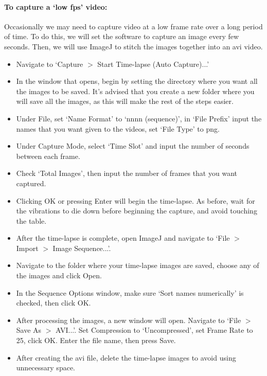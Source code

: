 \paragraph*{To capture a `low fps' video:}
Occasionally we may need to capture video at a low frame rate over a long period of time.
To do this, we will set the software to capture an image every few seconds.
Then, we will use ImageJ to stitch the images together into an avi video.
\begin{itemize}
\item Navigate to `Capture $>$ Start Time-lapse (Auto Capture)...'
\item In the window that opens, begin by setting the directory where you want all the images to be saved. It's advised that you create a new folder where you will save all the images, as this will make the rest of the steps easier.
\item Under File, set `Name Format' to `nnnn (sequence)', in `File Prefix' input the names that you want given to the videos, set `File Type' to png.
\item Under Capture Mode, select `Time Slot' and input the number of seconds between each frame.
\item Check `Total Images', then input the number of frames that you want captured.
\item Clicking OK or pressing Enter will begin the time-lapse. As before, wait for the vibrations to die down before beginning the capture, and avoid touching the table.
\item After the time-lapse is complete, open ImageJ and navigate to `File $>$ Import $>$ Image Sequence...'.
\item Navigate to the folder where your time-lapse images are saved, choose any of the images and click Open.
\item In the Sequence Options window, make sure `Sort names numerically' is checked, then click OK.
\item After processing the images, a new window will open. Navigate to `File $>$ Save As $>$ AVI...'. Set Compression to `Uncompressed', set Frame Rate to 25, click OK. Enter the file name, then press Save.
\item After creating the avi file, delete the time-lapse images to avoid using unnecessary space.
\end{itemize}


